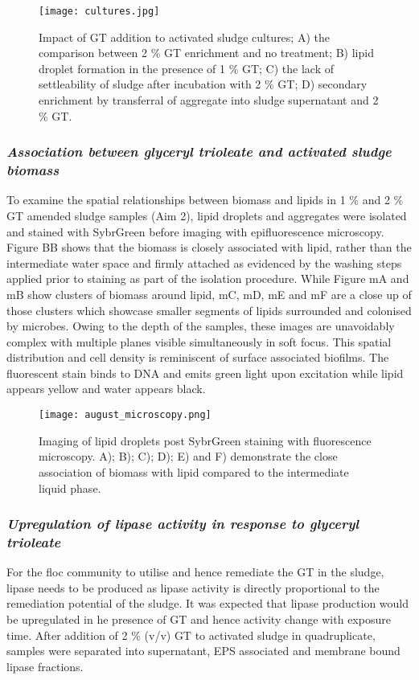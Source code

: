 \documentclass[11pt]{article}
\begin{document}
\begin{figure}
\texttt{[image: cultures.jpg]}
\caption{Impact of GT addition to activated sludge cultures; A) the comparison between 2 \% GT enrichment and no treatment; B) lipid droplet formation in the presence of 1 \% GT; C) the lack of settleability of sludge after incubation with 2 \% GT; D) secondary enrichment by transferral of aggregate into sludge supernatant and 2 \% GT.}
\end{figure}
\FloatBarrier

\subsubsection{\emph{Association between glyceryl trioleate and activated sludge biomass}}
To examine the spatial relationships between biomass and lipids in 1 \% and 2 \% GT amended sludge samples (Aim 2), lipid droplets and aggregates were isolated and stained with SybrGreen before imaging with epifluorescence microscopy. Figure BB shows that the biomass is closely associated with lipid, rather than the intermediate water space and firmly attached as evidenced by the washing steps applied prior to staining as part of the isolation procedure. While Figure mA and mB show clusters of biomass around lipid, mC, mD, mE and mF are a close up of those clusters which showcase smaller segments of lipids surrounded and colonised by microbes. Owing to the depth of the samples, these images are unavoidably complex with multiple planes visible simultaneously in soft focus. This spatial distribution and cell density is reminiscent of surface associated biofilms.
The fluorescent stain binds to DNA and emits green light upon excitation while lipid appears yellow and water appears black.
\begin{figure}
\texttt{[image: august\_microscopy.png]}
\caption{Imaging of lipid droplets post SybrGreen staining with fluorescence microscopy. A); B); C); D); E) and F) demonstrate the close association of biomass with lipid compared to the intermediate liquid phase.}
\end{figure}

\FloatBarrier
\subsubsection{\emph{Upregulation of lipase activity in response to glyceryl trioleate}}
For the floc community to utilise and hence remediate the GT in the sludge, lipase needs to be produced as lipase activity is directly proportional to the remediation potential of the sludge. It was expected that lipase production would be upregulated in he presence of GT and hence activity change with exposure time.
After addition of 2 \% (v/v) GT to activated sludge in quadruplicate, samples were separated into supernatant, EPS associated and membrane bound lipase fractions. \\
\end{document}
